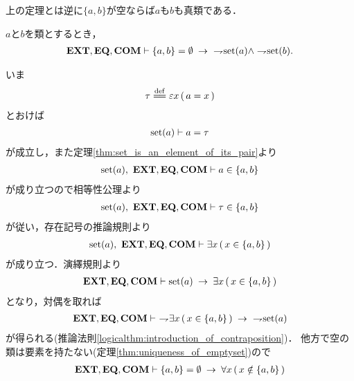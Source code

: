 	上の定理とは逆に$\{a,b\}$が空ならば$a$も$b$も真類である．
	
	\begin{screen}
		\begin{thm}[空な対に表示されている類は集合ではない]
		\label{thm:classes_displayed_in_empty_pair_are_not_sets}
			$a$と$b$を類とするとき，
			\begin{align}
				\EXTAX,\EQAX,\COMAX \vdash \{a,b\} = \emptyset \rarrow\ \negation \set{a} \wedge \negation \set{b}.
			\end{align}
		\end{thm}
	\end{screen}
	
	\begin{sketch}
		いま
		\begin{align}
			\tau \defeq \varepsilon x\, (\, a = x\, )
		\end{align}
		とおけば
		\begin{align}
			\operatorname*{set} (a) \vdash a = \tau
		\end{align}
		が成立し，また定理\ref{thm:set_is_an_element_of_its_pair}より
		\begin{align}
			\operatorname*{set} (a),\ \mbox{{\bf EXT}},\mbox{{\bf EQ}},\mbox{\bf COM} \vdash a \in \{a,b\}
		\end{align}
		が成り立つので相等性公理より
		\begin{align}
			\operatorname*{set} (a),\ \mbox{{\bf EXT}},\mbox{{\bf EQ}},\mbox{\bf COM} \vdash \tau \in \{a,b\}
		\end{align}
		が従い，存在記号の推論規則より
		\begin{align}
			\operatorname*{set} (a),\ \mbox{{\bf EXT}},\mbox{{\bf EQ}},\mbox{\bf COM} \vdash \exists x\, (\, x \in \{a,b\}\, )
		\end{align}
		が成り立つ．演繹規則より
		\begin{align}
			\mbox{{\bf EXT}},\mbox{{\bf EQ}},\mbox{\bf COM} \vdash \operatorname*{set} (a) \hspace{0.25em}\rightarrow\hspace{0.25em} \exists x\, (\, x \in \{a,b\}\, )
		\end{align}
		となり，対偶を取れば
		\begin{align}
			\mbox{{\bf EXT}},\mbox{{\bf EQ}},\mbox{\bf COM} \vdash\ \rightharpoondown\hspace{-0.25em} \exists x\, (\, x \in \{a,b\}\, )
			\hspace{0.25em}\rightarrow\hspace{0.25em}\ \rightharpoondown\hspace{-0.25em} \operatorname*{set} (a)
			\label{fom:classes_displayed_in_empty_pair_are_not_sets_1}
		\end{align}
		が得られる(推論法則\ref{logicalthm:introduction_of_contraposition})．
		他方で空の類は要素を持たない(定理\ref{thm:uniqueness_of_emptyset})ので
		\begin{align}
			\mbox{{\bf EXT}},\mbox{{\bf EQ}},\mbox{\bf COM} \vdash \{a,b\} = \emptyset \hspace{0.25em}\rightarrow\hspace{0.25em} \forall x\, (\, x \notin \{a,b\}\, )
			\label{fom:classes_displayed_in_empty_pair_are_not_sets_2}
		\end{align}

\end{sketch}
